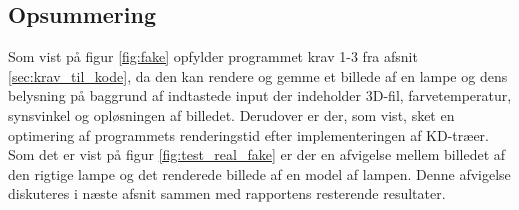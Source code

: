 \subsection*{Opsummering}
Som vist på figur \ref{fig:fake} opfylder programmet krav 1-3 fra afsnit \ref{sec:krav_til_kode}, da den kan rendere og gemme et billede af en lampe og dens belysning på baggrund af indtastede input der indeholder 3D-fil, farvetemperatur, synsvinkel og opløsningen af billedet. Derudover er der, som vist, sket en optimering af programmets renderingstid efter implementeringen af KD-træer. 
Som det er vist på figur \ref{fig:test_real_fake} er der en afvigelse mellem billedet af den rigtige lampe og det renderede billede af en model af lampen. Denne afvigelse diskuteres i næste afsnit sammen med rapportens resterende resultater. 


